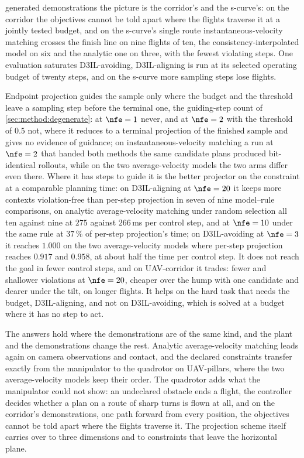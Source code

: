 \begin{description}
    generated demonstrations the picture is the corridor's and the s-curve's: on the corridor the
    objectives cannot be told apart where the flights traverse it at a jointly tested budget, and on
    the s-curve's single route instantaneous-velocity matching crosses the finish line on nine
    flights of ten, the consistency-interpolated model on six and the analytic one on three, with the
    fewest violating steps. One evaluation saturates D3IL-avoiding, D3IL-aligning is run at its
    selected operating budget of twenty steps, and on the s-curve more sampling steps lose flights.
  \item[RQ2 --- Constraints.] Endpoint projection guides the sample only where the budget and the
    threshold leave a sampling step before the terminal one, the guiding-step count of
    \autoref{sec:method:degenerate}: at $\nfe = 1$ never, and at $\nfe = 2$ with the threshold of
    $0.5$ not, where it reduces to a terminal projection of the finished sample and gives no evidence
    of guidance; on instantaneous-velocity matching a run at $\nfe = 2$ that handed both methods the
    same candidate plans produced bit-identical rollouts, while on the two average-velocity models the
    two arms differ even there. Where it has steps to guide it is the better projector on the
    constraint at a comparable planning time: on D3IL-aligning at $\nfe = 20$ it keeps more contexts
    violation-free than per-step projection in seven of nine model--rule comparisons, on analytic
    average-velocity matching under random selection all ten against nine at $275$ against
    $266$\,ms per control step, and at $\nfe = 10$ under the same rule at $37\,\%$ of per-step
    projection's time; on D3IL-avoiding at $\nfe = 3$ it reaches $1.000$ on the two average-velocity
    models where per-step projection reaches $0.917$ and $0.958$, at about half the time per control
    step. It does not reach the goal in fewer control steps, and on UAV-corridor it trades: fewer and
    shallower violations at $\nfe = 20$, cheaper over the hump with one candidate and dearer under
    the tilt, on longer flights. It helps on the hard task that needs the budget, D3IL-aligning, and
    not on D3IL-avoiding, which is solved at a budget where it has no step to act.
  \item[RQ3 --- Transfer.] The answers hold where the demonstrations are of the same kind, and the
    plant and the demonstrations change the rest. Analytic average-velocity matching leads again on
    camera observations and contact, and the declared constraints transfer exactly from the
    manipulator to the quadrotor on UAV-pillars, where the two average-velocity models keep their
    order. The quadrotor adds what the manipulator could not show: an undeclared obstacle ends a
    flight, the controller decides whether a plan on a route of sharp turns is flown at all, and on
    the corridor's demonstrations, one path forward from every position, the objectives cannot be
    told apart where the flights traverse it. The projection scheme itself carries over to three
    dimensions and to constraints that leave
    the horizontal plane.
\end{description}
